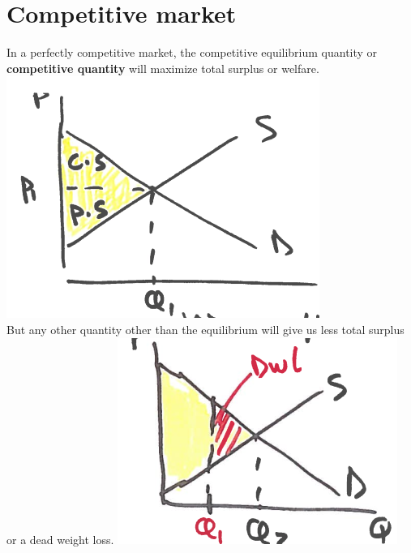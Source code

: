 \documentclass[../ECON-281-Notes.tex]{subfiles}
\begin{document}
\section{Competitive market}
In a perfectly competitive market, the competitive equilibrium quantity or \textbf{competitive quantity} will maximize total surplus or welfare.
\includegraphics[width=0.85\columnwidth]{assets/image-2021-12-11-12-18-36.png} \\

But any other quantity other than the equilibrium will give us less total surplus or a dead weight loss.
\includegraphics[width=0.85\columnwidth]{assets/image-2021-12-11-12-18-54.png}\\
\end{document}
